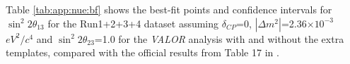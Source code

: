 Table \ref{tab:app:nue:bf} shows the best-fit points and confidence intervals for $\sin^{2}2\theta_{13}$ for the Run1+2+3+4 dataset assuming $\delta_{CP}$=0, $|\Delta m^{2}|$=2.36$\times10^{-3}$ $eV^{2}/c^{4}$ and $\sin^{2}2\theta_{23}$=1.0 for the {\em VALOR} analysis with and without the extra templates, compared with the official results from Table 17 in \cite{2013nuenergy}.






